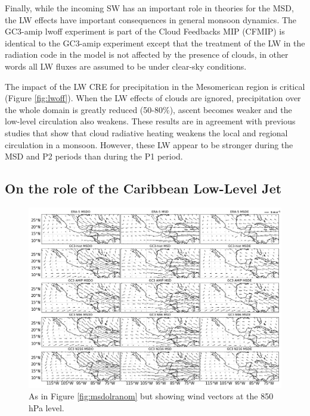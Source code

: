 Finally, while the incoming SW has an important role in theories for the MSD, the LW effects have important consequences in general monsoon dynamics. 
The GC3-amip lwoff experiment is part of the Cloud Feedbacks MIP (CFMIP) is identical to the GC3-amip experiment except that the treatment of the LW in the radiation code in the model is not affected by the presence of clouds, in other words all LW fluxes are assumed to be under clear-sky conditions. 

The impact of the LW CRE for precipitation in the Mesomerican region is critical (Figure \ref{fig:lwoff}). When the LW effects of clouds are ignored, precipitation over the whole domain is greatly reduced (50-80\%), ascent becomes weaker and the low-level circulation also weakens. 
These results are in agreement with previous studies \citep{guo2015,byrne2020} that show that cloud radiative heating weakens the local and regional circulation in a monsoon. However, these LW appear to be stronger during the MSD and P2 periods than during the P1 period. 





\subsection{On the role of the Caribbean Low-Level Jet}

 \begin{figure}[t!]
\includegraphics[width=\linewidth]{figures/modcompar_dif2u3}
\caption{As in Figure \ref{fig:msdolranom} but showing wind vectors at the 850 hPa level. }
\label{fig:msduanom}
\end{figure}


